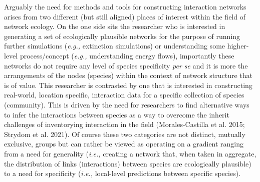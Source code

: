 \documentclass[
  letterpaper,
  DIV=11,
  numbers=noendperiod]{scrartcl}
\begin{document}
Arguably the need for methods and tools for constructing interaction
networks arises from two different (but still aligned) places of
interest within the field of network ecology. On the one side sits the
researcher who is interested in generating a set of ecologically
plausible networks for the purpose of running further simulations
(\emph{e.g.,} extinction simulations) or understanding some higher-level
process/concept (\emph{e.g.,} understanding energy flows), importantly
these networks do not require any level of species specificity \emph{per
se} and it is more the arrangements of the nodes (species) within the
context of network structure that is of value. This researcher is
contrasted by one that is interested in constructing real-world,
location specific, interaction data for a specific collection of species
(community). This is driven by the need for researchers to find
alternative ways to infer the interactions between species as a way to
overcome the inherit challenges of inventorying interaction in the field
(Morales-Castilla et al. 2015; Strydom et al. 2021). Of course these two
categories are not distinct, mutually exclusive, groups but can rather
be viewed as operating on a gradient ranging from a need for generality
(\emph{i.e.,} creating a network that, when taken in aggregate, the
distribution of links (interactions) between species are ecologically
plausible) to a need for specificity (\emph{i.e.,} local-level
predictions between specific species).
\end{document}
